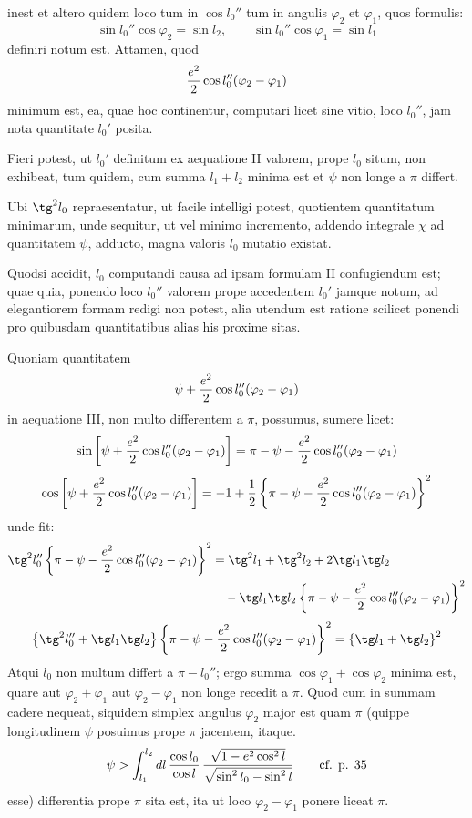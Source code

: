 \begingroup\small
inest et altero quidem loco tum in $\cos l_0''$ tum in angulis $\varphi_2$ et $\varphi_1$, quos formulis:
\[
 \sin l_0''\cos\varphi_2=\sin l_2,
 \qquad
 \sin l_0''\cos\varphi_1=\sin l_1
\]
definiri notum est.
Attamen, quod
\[
 {e^2\over2}\cos l_0''(\varphi_2-\varphi_1)
\]
minimum est, ea, quae hoc continentur, computari licet sine vitio, loco $l_0''$, jam nota quantitate $l_0'$ posita.

Fieri potest, ut $l_0'$ definitum ex aequatione II valorem, prope $l_0$ situm, non exhibeat, tum quidem, cum summa $l_1+l_2$ minima est et $\psi$ non longe a $\pi$ differt.

Ubi $\tg^2l_0$ repraesentatur, ut facile intelligi potest, quotientem quantitatum minimarum, unde sequitur, ut vel minimo incremento, addendo integrale $\chi$ ad quantitatem $\psi$, adducto, magna valoris $l_0$ mutatio existat.

Quodsi accidit, $l_0$ computandi causa ad ipsam formulam II confugiendum est; quae quia, ponendo loco $l_0''$ valorem prope accedentem $l_0'$ jamque notum, ad elegantiorem formam redigi non potest, alia utendum est ratione scilicet ponendi pro quibusdam quantitatibus alias his proxime sitas.

Quoniam quantitatem
\[
 \psi+{e^2\over2}\cos l_0''(\varphi_2-\varphi_1)
\]
in aequatione III, non multo differentem a $\pi$, possumus, sumere licet:
\[
 \sin\left[\psi+{e^2\over2}\cos l_0''(\varphi_2-\varphi_1)\right]
=\pi-\psi-{e^2\over2}\cos l_0''(\varphi_2-\varphi_1)
\]
\[
 \cos\left[\psi+{e^2\over2}\cos l_0''(\varphi_2-\varphi_1)\right]
=-1+{1\over2}\left\{\pi-\psi-{e^2\over2}\cos l_0''(\varphi_2-\varphi_1)\right\}^2
\]
unde fit:
\[
\begin{aligned}
\tg^2l_0''\left\{\pi-\psi-{e^2\over2}\cos l_0''(\varphi_2-\varphi_1)\right\}^2
&=\tg^2l_1+\tg^2l_2+2\tg l_1\tg l_2\\
&\quad-\tg l_1\tg l_2\left\{\pi-\psi-{e^2\over2}\cos l_0''(\varphi_2-\varphi_1)\right\}^2
\end{aligned}
\]
\[
\left\{\tg^2l_0''+\tg l_1\tg l_2\right\}\left\{\pi-\psi-{e^2\over2}\cos l_0''(\varphi_2-\varphi_1)\right\}^2
=\left\{\tg l_1+\tg l_2\right\}^2
\]
Atqui $l_0$ non multum differt a $\pi-l_0''$; ergo summa $\cos\varphi_1+\cos\varphi_2$ minima est, quare aut $\varphi_2+\varphi_1$ aut $\varphi_2-\varphi_1$ non longe recedit a $\pi$. Quod cum in summam cadere nequeat, siquidem simplex angulus $\varphi_2$ major est quam $\pi$ (quippe longitudinem $\psi$ posuimus prope $\pi$ jacentem, itaque.
\[
\psi>\int_{l_1}^{l_2} dl\,{\cos l_0\over\cos l}\,{\sqrt{1-e^2\cos^2l}\over\sqrt{\sin^2l_0-\sin^2l}}
\qquad \text{cf. p. 35}
\]
esse) differentia  prope $\pi$ sita est, ita ut loco $\varphi_2-\varphi_1$ ponere liceat $\pi$.
\endgroup
